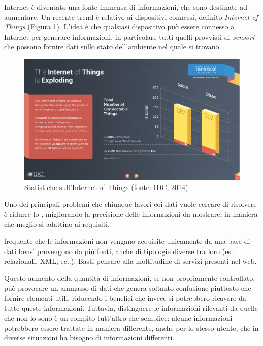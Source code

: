 Internet è diventato una fonte immensa di informazioni, che sono destinate ad aumentare. Un recente trend è relativo ai dispositivi connessi, definito \emph{Internet of Things} (Figura \ref{fig:statistiche-iot}). L'idea è che qualsiasi dispositivo può essere connesso a Internet per generare informazioni, in particolare tutti quelli provvisti di \emph{sensori} che possono fornire dati sullo stato dell'ambiente nel quale si trovano.

\begin{figure}[ht]
	\centering
	\includegraphics[width=\textwidth]{1-introduzione/Immagini/iot-trend.pdf}
	\caption[Statistiche sull'Internet of Things]{Statistiche sull'Internet of Things (fonte: IDC, 2014)\label{fig:statistiche-iot}}
\end{figure}

Uno dei principali problemi che chiunque lavori coi dati vuole cercare di risolvere è ridurre lo , migliorando la precisione delle informazioni da mostrare, in maniera che meglio si adattino ai requisiti.

\upe frequente che le informazioni non vengano acquisite unicamente da una base di dati bensì provengono da più fonti, anche di tipologie diverse tra loro (es.: relazionali, XML, ec..). Basti pensare alla moltitudine di servizi presenti nel web.

Questo aumento della quantità di informazioni, se non propriamente controllato, può provocare un ammasso di dati che genera soltanto confusione piuttosto che fornire elementi utili, riducendo i benefici che invece si potrebbero ricavare da tutte queste informazioni. Tuttavia, distinguere le informazioni rilevanti da quelle che non lo sono è un compito tutt'altro che semplice: alcune informazioni potrebbero essere trattate in maniera differente, anche per lo stesso utente, che in diverse situazioni ha bisogno di informazioni differenti. 

